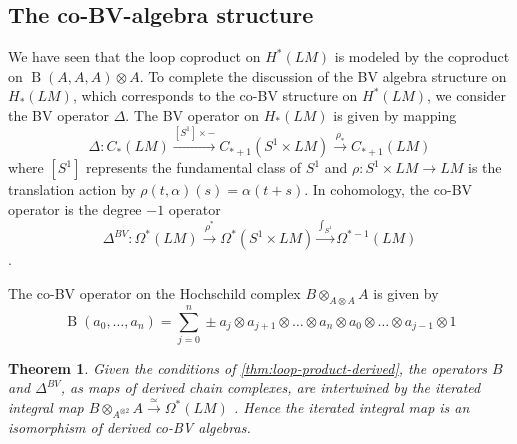 \documentclass{scrartcl}
\theoremstyle{plain}
\newtheorem{theorem}{Theorem}[section]
\newtheorem{proposition}[theorem]{Proposition}
\theoremstyle{definition}
\newcommand{\quiso}{\simeq}
\let\xto\xrightarrow
\let\xfrom\xleftarrow
\DeclareMathOperator{\BC}{B}
\newcommand{\blank}{-}
\begin{document}


\subsection{The co-BV-algebra structure} \label{subsec:co-bv-alg}
We have seen that the loop coproduct on $H^*(LM)$ is modeled by the coproduct on $\BC(A, A, A)\otimes A$. To complete the discussion of the BV algebra structure on $H_*(LM)$, which corresponds to the co-BV structure on $H^*(LM)$, we consider the BV operator $\Delta$. The BV operator on $H_*(LM)$ is given by mapping $$\Delta\colon C_*(LM)\xto{[S^1]\times\blank} C_{*+1}(S^1\times LM)\xto{\rho_*} C_{*+1}(LM)$$
where $[S^1]$ represents the fundamental class of $S^1$ and $\rho\colon S^1\times LM\to LM$ is the translation action by $\rho(t, \alpha)(s) = \alpha(t+s)$. In cohomology, the co-BV operator is the degree $-1$ operator $$\Delta^{BV}\colon \Omega^*(LM) \xto{\rho^*} \Omega^*(S^1\times LM) \xto{\int_{S^1}} \Omega^{*-1}(LM)$$.

The co-BV operator on the Hochschild complex $B\otimes_{A\otimes A} A$ is given by $$\BC(a_0, \dots, a_n) = \sum_{j=0}^n \pm a_j\otimes  a_{j+1}\otimes  \dots\otimes  a_n\otimes  a_0\otimes  \dots \otimes a_{j-1} \otimes 1$$

\begin{theorem}\label{thm:bv-iso}
    Given the conditions of \cref{thm:loop-product-derived}, the operators $B$ and $\Delta^{BV}$, as maps of derived chain complexes, are intertwined by the iterated integral map $B\otimes_{A^{\otimes 2}} A \xto{\quiso}\Omega^*(LM)$ . Hence the iterated integral map is an isomorphism of derived co-BV algebras. 
\end{theorem}
\end{document}
